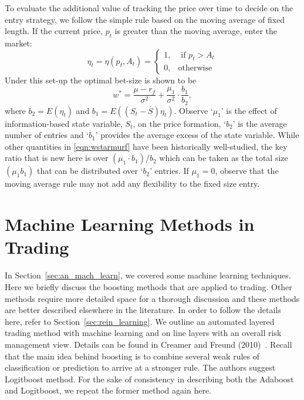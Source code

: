 To evaluate the additional value of tracking the price over time to decide on the entry strategy, we follow the simple rule based on the moving average of fixed length. If the current price, $p_t$ is greater than the moving average, enter the market:
	\begin{equation} \label{eqn:etatetapt}
	\eta_t= \eta(p_t,A_t)= \begin{cases}
	1, & \text{ if } p_t > A_t \\
	0, & \text{otherwise}
	\end{cases}
	\end{equation}
Under this set-up the optimal bet-size is shown to be
	\begin{equation} \label{eqn:wstarmurf}
	w^*= \dfrac{\mu - r_f}{\sigma^2} + \dfrac{\mu_1}{\sigma^2} \cdot \dfrac{b_1}{b_2},
	\end{equation}
where $b_2=E(\eta_t)$ and $b_1=E((S_t - \overline{S}) \eta_t)$. Observe `$\mu_1$' is the effect of information-based state variable, $S_t$, on the price formation, `$b_2$' is the average number of entries and `$b_1$' provides the average excess of the state variable. While other quantities in \eqref{eqn:wstarmurf} have been historically well-studied, the key ratio that is new here is over $(\mu_1 \cdot b_1)/b_2$ which can be taken as the total size $(\mu_1 b_1)$ that can be distributed over `$b_2$' entries. If $\mu_1= 0$, observe that the moving average rule may not add any flexibility to the fixed size entry. 



\section{Machine Learning Methods in Trading}

In Section~\ref{sec:an_mach_learn},\label{in:boost2} we covered some machine learning techniques. Here we briefly discuss the boosting methods that are applied to trading. Other methods require more detailed space for a thorough discussion and these methods are better described elsewhere in the literature. In order to follow the details here, refer to Section~\ref{sec:rein_learning}. We outline an automated layered trading method with machine learning and on line layers with an overall risk management view.\label{in:machine2} Details can be found in Creamer and Freund (2010)~\cite{creamer2010}. Recall that the main idea behind boosting is to combine several weak rules of classification or prediction to arrive at a stronger rule. The authors suggest Logitboost method. For the sake of consistency in describing both the Adaboost and Logitboost, we repeat the former method  again here. 


